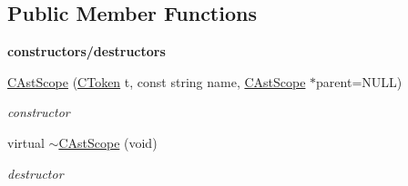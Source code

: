 \subsection*{Public Member Functions}
\begin{Indent}{\bf constructors/destructors}\par
\begin{DoxyCompactItemize}
\item 
\hyperlink{classCAstScope_af459a08085167ac5b826613f51b1df42}{C\-Ast\-Scope} (\hyperlink{classCToken}{C\-Token} t, const string name, \hyperlink{classCAstScope}{C\-Ast\-Scope} $\ast$parent=N\-U\-L\-L)
\begin{DoxyCompactList}\small\item\em constructor \end{DoxyCompactList}\item 
\hypertarget{classCAstScope_a96809bddbe421161ae24ac198084afde}{virtual \hyperlink{classCAstScope_a96809bddbe421161ae24ac198084afde}{$\sim$\-C\-Ast\-Scope} (void)}\label{classCAstScope_a96809bddbe421161ae24ac198084afde}

\begin{DoxyCompactList}\small\item\em destructor \end{DoxyCompactList}\end{DoxyCompactItemize}
\end{Indent}
